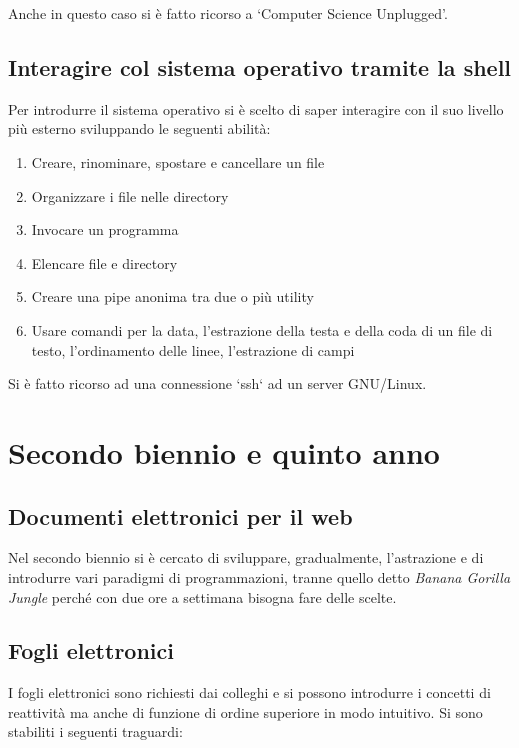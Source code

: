 \documentclass[a4paper]{easychair}
\begin{document}
Anche in questo caso si è fatto ricorso a `Computer Science Unplugged'.

\subsection[Sistemi Operativi]{Interagire col sistema operativo tramite la shell}

Per introdurre il sistema operativo si è scelto di saper interagire con il suo
livello più esterno sviluppando le seguenti abilità:

\begin{enumerate}
  \def\labelenumi{\arabic{enumi}.}
  \item
    Creare, rinominare, spostare e cancellare un file
  \item
    Organizzare i file nelle directory
  \item
    Invocare un programma
  \item
    Elencare file e directory
  \item
    Creare una pipe anonima tra due o più utility
  \item
    Usare comandi per la data, l'estrazione della testa e della coda
    di un file di testo, l'ordinamento delle linee, l'estrazione di campi
\end{enumerate}

Si è fatto ricorso ad una connessione `ssh` ad un server GNU/Linux.

\section{Secondo biennio e quinto anno}

\subsection[Web]{Documenti elettronici per il web}

Nel secondo biennio si è cercato di sviluppare, gradualmente, l'astrazione
e di introdurre vari paradigmi di programmazioni, tranne quello detto
\textit{Banana Gorilla Jungle} perché con due ore a settimana bisogna
fare delle scelte.
 
\subsection[Fogli elettronici]{Fogli elettronici}

I fogli elettronici sono richiesti dai colleghi e si possono
introdurre i concetti di reattività ma anche di funzione di
ordine superiore in modo intuitivo. Si sono stabiliti i seguenti
traguardi:
\end{document}
